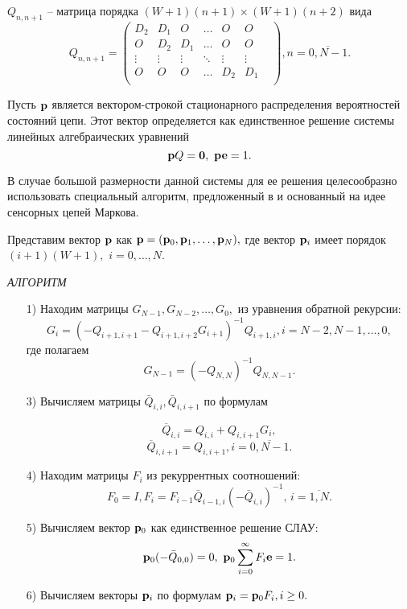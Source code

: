 \documentclass[12pt, a4paper]{article}
\begin{document}
	$Q_{n, n+1}$ -- матрица порядка $(W+1)(n+1)\times (W+1)(n+2)$ вида
	$$
	Q_{n, n+1}=\left(\begin{matrix}
	D_2&D_1&O& \ldots &O&O&\\
	O&D_2&D_1& \ldots &O&O&\\
	\vdots & \vdots & \vdots &\ddots & \vdots & \vdots \\
	O&O&O& \ldots &D_2&D_1\\
	\end{matrix}\right), n=\overline{0, N-1}.
	$$
	
	
	Пусть ${\bf p}$ является вектором-строкой стационарного
	распределения  вероятностей состояний цепи. Этот вектор определяется
	как единственное  решение
	системы линейных алгебраических уравнений
	$$
	{\bf p}Q={\bf 0},\,\,{\bf p}{\bf e}=1.
	$$
	
	В случае большой размерности данной системы для ее решения
	целесообразно использовать специальный  алгоритм, предложенный в \cite{KlimKimOrlDud} и основанный на идее сенсорных 
	цепей Маркова.
	
	Представим вектор ${\bf p}$  как
	${\bf p}=({\bf p}_0, {\bf p}_1,\ldots, {\bf p}_N),$ где
	вектор ${\bf p}_i$ имеет порядок  $(i+1)(W+1),$   $ i=0,\ldots,N.$
	
	
	{\it АЛГОРИТМ}
	
	\begin{itemize}
		
		\item[1)] Находим матрицы $G_{N-1},G_{N-2},\ldots, G_0,$ из уравнения обратной рекурсии:
		$$
		G_{i}=\left(
		-Q_{i+1,i+1}-Q_{i+1,i+2}G_{i+1}\right)^{-1}Q_{i+1,i},i=N-2, N-1,\ldots,0,
		$$
		где полагаем
		$$
		G_{N-1}=(-Q_{N,N})^{-1}Q_{N,N-1}.
		$$
		
		\item[3)] Вычисляем матрицы $\bar{Q}_{i,i}, \bar{Q}_{i,i+1}$ по формулам
		
		$$
		\overline{Q}_{i,i}=Q_{i,i}+Q_{i,i+1}G_i,
		$$
		$$
		\overline{Q}_{i,i+1}=Q_{i,i+1},i=\overline{0,N-1}.
		$$
		
		\item[4)] Находим матрицы $F_{i}$  из рекуррентных соотношений:
		$$
		F_{0}=I,F_{i}=F_{i-1}\bar{Q}_{i-1,i}\left( -\bar{Q}_{i,i}
		\right)^{-1},\,i=\overline{1,N}.
		$$
		
		\item[5)] Вычисляем вектор ${\bf p}_{0}$ как единственное решение
		СЛАУ:
		$$
		{\bf p}_{0}(-\bar{Q}_{0,0})=0,\,\,
		{\bf p}_{0}\displaystyle\sum_{i=0}^{\infty} F_{i}{\bf e}=1.
		$$
		\item[6)] Вычисляем векторы ${\bf p}_i$  по формулам
		$
		{\bf p}_i={\bf p}_0 F_{i},i\geq 0.
		$
		
	\end{itemize}
	
\end{document}
